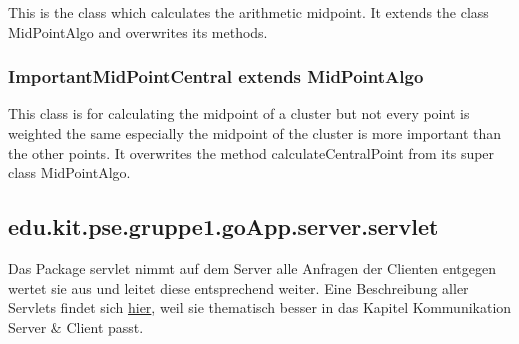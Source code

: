 	This is the class which calculates the arithmetic midpoint. It extends the class MidPointAlgo and overwrites its methods.	
	
	
	
	
	
	
	\subsubsection{ImportantMidPointCentral extends MidPointAlgo}
	
	This class is for calculating the midpoint of a cluster but not every point is weighted the same especially the midpoint of the cluster is more important than the other points. It overwrites the method calculateCentralPoint from its super class MidPointAlgo. 	
	
	

	\subsection{edu.kit.pse.gruppe1.goApp.server.servlet}
	Das Package servlet nimmt auf dem Server alle Anfragen der Clienten entgegen wertet sie aus und leitet diese entsprechend weiter. Eine Beschreibung aller Servlets findet sich \hyperlink{Servlets}{hier}, weil sie thematisch besser in das Kapitel Kommunikation Server \& Client passt.
	\newpage
